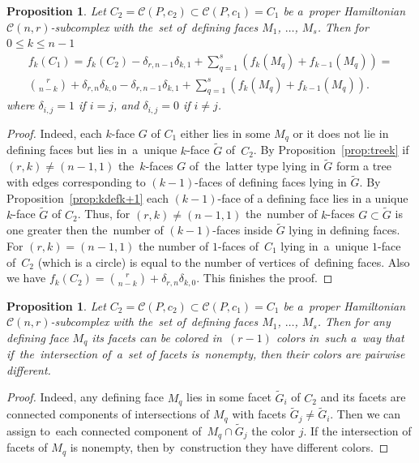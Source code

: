 \documentclass[12pt]{amsart}
\newtheorem{proposition}[formula]{Proposition}
\theoremstyle{definition}
\theoremstyle{remark}
\begin{document}
\begin{proposition}\label{prop:fkform}
Let $C_2=\mathcal{C}(P,c_2)\subset \mathcal{C}(P,c_1)=C_1$ be a~proper Hamiltonian $\mathcal{C}(n,r)$-subcomplex
with the~set of~defining faces $M_1$, $\dots$, $M_s$. 
Then for $0\leqslant k\leqslant n-1$ 
\begin{gather}\label{eq:kk-1}
f_k(C_1)=f_k(C_2)-\delta_{r,n-1}\delta_{k,1}+\sum\limits_{q=1}^s\left(f_k(M_q)+f_{k-1}(M_q)\right)=\\
{r\choose n-k}+\delta_{r,n}\delta_{k,0}-\delta_{r,n-1}\delta_{k,1} +\sum\limits_{q=1}^s\left(f_k(M_q)+f_{k-1}(M_q)\right).
\end{gather}
where $\delta_{i,j}=1$ if $i=j$,  and $\delta_{i,j}=0$ if $i\ne j$.
\end{proposition}
\begin{proof}
Indeed, each $k$-face $G$ of $C_1$ either lies in some $M_q$ or it does not lie in defining faces but lies 
in~a~unique $k$-face $\widetilde{G}$ of~$C_2$. By Proposition~\ref{prop:treek} if $(r,k)\ne (n-1,1)$ 
the~$k$-faces $G$ of~the~latter type lying in $\widetilde{G}$ form a tree with edges corresponding to $(k-1)$-faces 
of defining faces lying in $\widetilde{G}$. 
By Proposition~\ref{prop:kdefk+1} each $(k-1)$-face of a defining face lies in a unique $k$-face $\widetilde{G}$ of $C_2$.
Thus, for $(r,k)\ne (n-1,1)$ the~number of $k$-faces $G\subset \widetilde{G}$ is one greater then the~number 
of $(k-1)$-faces inside $\widetilde{G}$
lying in defining faces. For $(r,k)=(n-1,1)$ the number of $1$-faces of~$C_1$ lying in~a~unique $1$-face
of~$C_2$ (which is a circle) is equal to the number of vertices of~defining faces. Also we have 
$f_k(C_2)={r\choose n-k}+\delta_{r,n}\delta_{k,0}$. This finishes the proof. 
\end{proof}

\begin{proposition}\label{prop:Mq}
Let $C_2=\mathcal{C}(P,c_2)\subset \mathcal{C}(P,c_1)=C_1$ be a~proper Hamiltonian $\mathcal{C}(n,r)$-subcomplex
with the~set of~defining faces $M_1$, $\dots$, $M_s$. Then for any defining face $M_q$ its facets can be colored 
in~$(r-1)$ colors in~such a~way that if~the~intersection of~a~set of facets is~nonempty, then their colors are pairwise different. 
\end{proposition}
\begin{proof}
Indeed, any defining face $M_q$ lies in some facet $\widetilde{G}_i$ of $C_2$ and its facets are connected 
components of intersections of $M_q$ with facets $\widetilde{G}_j\ne \widetilde{G}_i$. Then we can assign 
to~each connected component of~$M_q\cap \widetilde{G}_j$ the color $j$. If the intersection of facets of $M_q$
is nonempty, then by~construction they have different colors. 
\end{proof}
\end{document}
